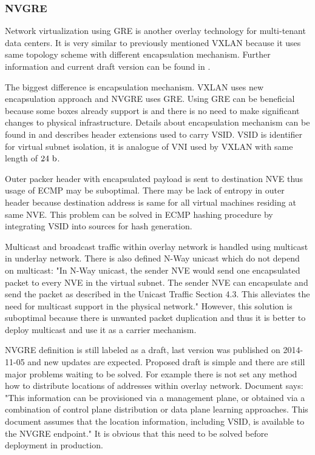 \subsubsection{NVGRE}
Network virtualization using \Ac{GRE} is another overlay technology for multi-tenant data centers. It is very similar to previously mentioned \Ac{VXLAN} because it uses same topology scheme with different encapsulation mechanism. Further information and current draft version can be found in \cite{draft-nvgre}\cite{rfc2748}\cite{rfc2890}.

The biggest difference is encapsulation mechanism. \Ac{VXLAN} uses new encapsulation approach and \Ac{NVGRE} uses \Ac{GRE}.  Using \Ac{GRE} can be beneficial because some boxes already support is and there is no need to make significant changes to physical infrastructure. Details about encapsulation mechanism can be found in \cite{rfc2748} and \cite{rfc2890} describes header extensions used to carry \Ac{VSID}. \Ac{VSID} is identifier for virtual subnet isolation, it is analogue of \Ac{VNI} used by \Ac{VXLAN} with same length of $24~\mathrm{b}$.

Outer packer header with encapsulated payload is sent to destination \Ac{NVE} thus usage of \Ac{ECMP} may be suboptimal. There may be lack of entropy in outer header because destination address is same for all virtual machines residing at same \Ac{NVE}. This problem can be solved in \Ac{ECMP} hashing procedure by integrating \Ac{VSID} into sources for hash generation.

Multicast and broadcast traffic within overlay network is handled using multicast in underlay network. There is also defined N-Way unicast which do not depend on multicast: "In N-Way unicast, the sender NVE would send one encapsulated packet to every NVE in the virtual subnet. The sender NVE can encapsulate and send the packet as described in the Unicast Traffic Section 4.3. This alleviates the need for multicast support in the physical network." \cite{draft-nvgre}
However, this solution is suboptimal because there is unwanted packet duplication and thus it is better to deploy multicast and use it as a carrier mechanism.

\Ac{NVGRE} definition \cite{draft-nvgre} is still labeled as a draft, last version was published on 2014-11-05 and new updates are expected. Proposed draft is  simple and there are still major problems waiting to be solved. For example there is not set any method how to distribute locations of addresses within overlay network. Document \cite{draft-nvgre} says: "This information can be provisioned via a management plane, or obtained via a combination of control plane distribution or data plane learning approaches. This document assumes that the location information, including VSID, is available to the NVGRE endpoint." It is obvious that this need to be solved before deployment in production. 

